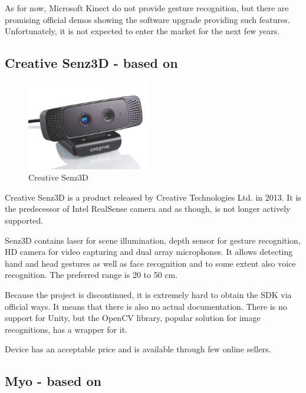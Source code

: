 As for now, Microsoft Kinect do not provide gesture recognition, but there are promising official demos showing the software upgrade providing such features. Unfortunately, it is not expected to enter the market for the next few years.

\subsection{Creative Senz3D - based on \cite{senz_parts, senz, senz_opencv}}

\begin{figure}
\includegraphics[width=0.48\textwidth]{graphics/senz.jpg} 
\caption{Creative Senz3D}
\vspace{-8pt}
\label{fig:senz}
\end{figure}

Creative Senz3D is a product released by Creative Technologies Ltd. in 2013. It is the predecessor of Intel RealSense camera and as though, is not longer actively supported. 

Senz3D contains laser for scene illumination, depth sensor for gesture recognition, HD camera for video capturing and dual array microphones. It allows detecting hand and head gestures as well as face recognition and to some extent also voice recognition. The preferred range is 20 to 50 cm.

Because the project is discontinued, it is extremely hard to obtain the SDK via official ways. It means that there is also no actual documentation. There is no support for Unity, but the OpenCV library, popular solution for image recognitions, has a wrapper for it.

Device has an acceptable price and is available through few online sellers. 

\subsection{Myo - based on \cite{myo, myo_specs, myo_article}}

